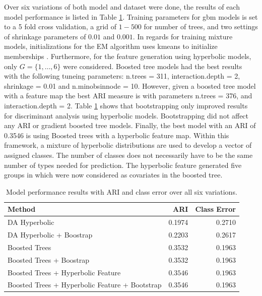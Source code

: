 \documentclass[11pt,letterpaper]{article}
\begin{document}
Over six variations of both model and dataset were done, the results of each model performance is listed in Table \ref{modelPerf}. Training parameters for gbm models is set to a 5 fold cross validation, a grid of $1-500$ for number of trees, and two settings of shrinkage parameters of $0.01$ and $0.001$. In regards for training mixture models, initializations for the EM algorithm uses kmeans to initialize memberships \citep{mixGHD}.  Furthermore, for the feature generation using hyperbolic models, only $G=\{1,\hdots,6\}$ were considered. Boosted tree models had the best results with the following tuneing parameters: n.trees = 311, interaction.depth = 2, shrinkage = 0.01 and n.minobsinnode = 10.   However, given a boosted tree model with a feature map the best ARI measure is with parameters n.trees = 376, and interaction.depth = 2. Table \ref{modelPerf} shows that  bootstrapping  only improved results for discriminant analysis using hyperbolic models. Bootstrapping did not affect any ARI or gradient boosted tree models. Finally, the best model with an ARI of 0.3546  is using Boosted trees with a hyperbolic feature map. Within this framework, a mixture of hyperbolic distributions are used to develop a vector of assigned classes. The number of classes does not necessarily have to be the same number of types needed for prediction. The hyperbolic feature generated five groups in which were now considered as covariates in the boosted tree. 


\begin{table}[!h]
\centering
\caption{Model performance results with ARI and class error over all six variations. }
\vspace{5pt}
\label{modelPerf}
\begin{tabular}{|l|rr|}
\hline\hline
Method                                         & ARI    & Class Error \\
\hline
DA Hyperbolic                                  & 0.1974 & 0.2710      \\
DA Hyperbolic + Boostrap                       & 0.2203 & 0.2617      \\
Boosted Trees                                  & 0.3532 & 0.1963      \\
Boosted Trees + Boostrap                       & 0.3532 & 0.1963      \\
Boosted Trees + Hyperbolic Feature             & $\bm{0.3546}$ & $\bm{0.1963}  $   \\
Boosted Trees + Hyperbolic Feature + Bootstrap & 0.3546 & 0.1963     \\
\hline\hline
\end{tabular}
\end{table}
\end{document}
